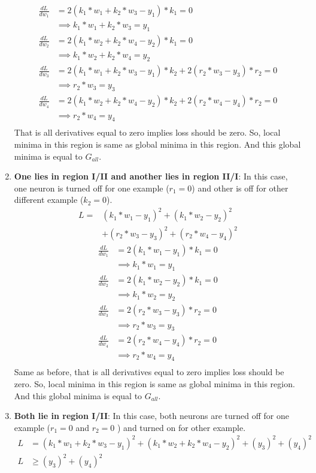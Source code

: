 \documentclass[conference]{IEEEtran}
\begin{document}
\begin{enumerate}
	\begin{align*}
		\frac{dL}{dw_1} &= 2(k_1*w_1 + k_2*w_3 - y_1)* k_1 = 0\\ 
		&\implies k_1*w_1 + k_2*w_3 = y_1\\
		\frac{dL}{dw_2} &= 2(k_1*w_2 + k_2*w_4 - y_2)* k_1 = 0\\ 
		&\implies k_1*w_2 + k_2*w_4 = y_2\\
		\frac{dL}{dw_3} &= 2(k_1*w_1 + k_2*w_3 - y_1)* k_2 + 2(r_2*w_3-y_3)*r_2 = 0\\
		&\implies r_2*w_3 = y_3\\
		\frac{dL}{dw_4} &= 2(k_1*w_2 + k_2*w_4 - y_2)* k_2 + 2(r_2*w_4-y_4)*r_2 = 0\\ 
		&\implies r_2*w_4 = y_4\\
	\end{align*}
	That is all derivatives equal to zero implies loss should be zero. So, local minima in this region is same as global minima in this region. And this global minima is equal to $G_{all}$.
	\item \textbf{One lies in region I/II and another lies in region II/I}:  In this case, one neuron is turned off for one example ($r_1 = 0$) and other is off for other different example ($k_2 = 0$).
	\begin{align*}
	L  = &(k_1 * w_1 - y_1)^2 + (k_1 * w_2 - y_2)^2\\ 
	 &+ (r_2*w_3 - y_3)^2 + (r_2*w_4 - y_4)^2
	\end{align*}
	\begin{align*}
	\frac{dL}{dw_1} &= 2(k_1*w_1 - y_1)* k_1 = 0\\ 
	&\implies k_1*w_1 = y_1\\
	\frac{dL}{dw_2} &= 2(k_1*w_2 - y_2)* k_1 = 0\\ 
	&\implies k_1*w_2 = y_2\\
	\frac{dL}{dw_3} &= 2(r_2*w_3-y_3)*r_2 = 0\\
	&\implies r_2*w_3 = y_3\\
	\frac{dL}{dw_4} &= 2(r_2*w_4-y_4)*r_2 = 0\\ 
	&\implies r_2*w_4 = y_4\\
	\end{align*}
	Same as before, that is all derivatives equal to zero implies loss should be zero. So, local minima in this region is same as global minima in this region. And this global minima is equal to $G_{all}$.
	\item \textbf{Both lie in region I/II}: In this case, both neurons are turned off for one example ($r_1 = 0$ and $r_2 = 0$ ) and turned on for other example. 
	\begin{align*}
	L &= (k_1 * w_1 + k_2 * w_3 - y_1)^2 + (k_1 * w_2 + k_2 * w_4 - y_2)^2 + (y_3)^2 + (y_4)^2 \\ 
	L &\geq (y_3)^2 + (y_4)^2
	\end{align*}
	

\end{enumerate}
\end{document}

